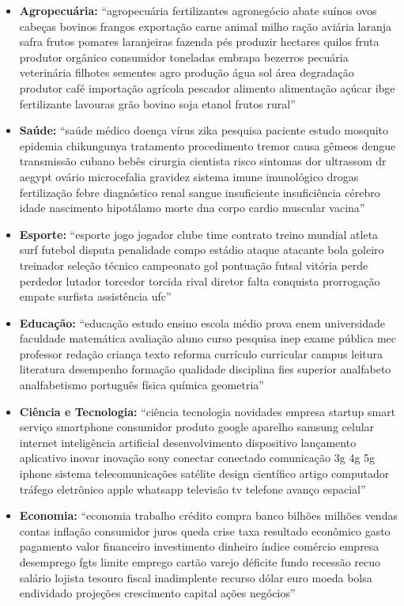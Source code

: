 \begin{apendicesenv}
\begin{itemize}
    \item \textbf{Agropecuária:} ``agropecuária fertilizantes agronegócio abate suínos ovos cabeças bovinos frangos exportação carne animal milho ração aviária laranja safra frutos pomares laranjeiras fazenda pés produzir hectares quilos fruta  produtor orgânico consumidor toneladas  embrapa bezerros pecuária veterinária filhotes sementes agro produção água sol área degradação produtor café importação agrícola pescador alimento alimentação açúcar ibge fertilizante lavouras grão bovino soja etanol frutos rural''
    \item \textbf{Saúde:} ``saúde médico doença vírus zika pesquisa paciente estudo mosquito epidemia chikungunya tratamento procedimento tremor causa gêmeos dengue transmissão cubano bebês cirurgia cientista risco sintomas dor ultrassom dr aegypt ovário microcefalia gravidez sistema imune imunológico drogas fertilização febre diagnóstico renal sangue insuficiente insuficiência cérebro idade nascimento hipotálamo morte dna corpo cardio muscular vacina''
    \item \textbf{Esporte:} ``esporte jogo jogador clube time contrato treino mundial atleta surf futebol disputa penalidade compo estádio ataque atacante bola goleiro treinador seleção técnico campeonato gol pontuação futsal vitória perde perdedor lutador torcedor torcida rival diretor falta conquista prorrogação empate surfista assistência ufc''
    \item \textbf{Educação:} ``educação estudo ensino escola médio prova enem universidade faculdade matemática avaliação aluno curso pesquisa inep exame pública mec professor redação criança texto reforma currículo curricular campus leitura literatura desempenho formação qualidade disciplina fies superior analfabeto analfabetismo português física química geometria''
    \item \textbf{Ciência e Tecnologia:} ``ciência tecnologia novidades empresa startup smart serviço smartphone consumidor produto google aparelho samsung celular internet inteligência artificial desenvolvimento dispositivo lançamento  aplicativo inovar inovação sony conectar conectado comunicação 3g 4g 5g iphone sistema telecomunicações satélite design científico artigo computador tráfego eletrônico apple whatsapp televisão tv telefone avanço espacial''
    \item \textbf{Economia:} ``economia trabalho crédito compra banco bilhões milhões vendas contas inflação consumidor juros queda crise taxa resultado econômico gasto pagamento valor financeiro investimento dinheiro índice comércio empresa desemprego fgts limite emprego cartão varejo déficite fundo recessão recuo salário lojista tesouro fiscal inadimplente recurso dólar euro moeda bolsa endividado projeções crescimento capital ações negócios''

\end{itemize}
\end{apendicesenv}
